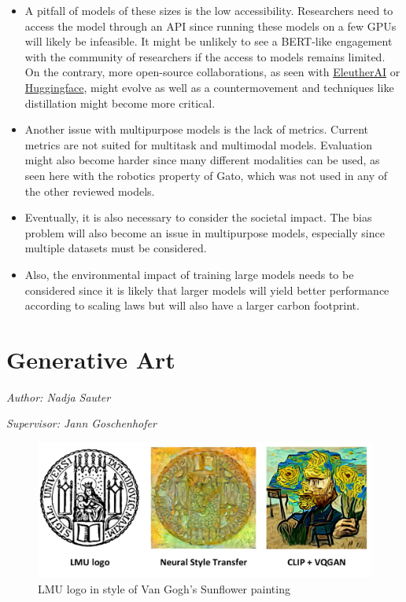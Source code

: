 \documentclass[
]{krantz}
\begin{document}
\begin{itemize}
\item
  A pitfall of models of these sizes is the low accessibility. Researchers need to access the model through an API since running these models on a few GPUs will likely be infeasible. It might be
  unlikely to see a BERT-like engagement with the community of researchers if the access to models remains limited. On the contrary, more open-source collaborations, as seen with
  \href{www.eleuther.ai}{EleutherAI} or \href{www.huggingface.co}{Huggingface}, might evolve as well as a countermovement and techniques like distillation \citep{Hinton2015} might become more critical.
\item
  Another issue with multipurpose models is the lack of metrics. Current metrics are not suited for multitask and multimodal models. Evaluation might also become harder since many different
  modalities can be used, as seen here with the robotics property of Gato, which was not used in any of the other reviewed models.
\item
  Eventually, it is also necessary to consider the societal impact. The bias problem will also become an issue in multipurpose models, especially since multiple datasets must be considered.
\item
  Also, the environmental impact of training large models needs to be considered since it is likely that larger models will yield better performance according to scaling laws \citep{Reed2022}
  but will also have a larger carbon footprint.
\end{itemize}

\hypertarget{c03-04-usecase}{%
\section{Generative Art}\label{c03-04-usecase}}

\emph{Author: Nadja Sauter}

\emph{Supervisor: Jann Goschenhofer}

\begin{figure}

{\centering \includegraphics[width=0.9\linewidth]{./figures/03-chapter3/Logo} 

}

\caption{LMU logo in style of Van Gogh's Sunflower painting}\label{fig:Logo}
\end{figure}
\end{document}
